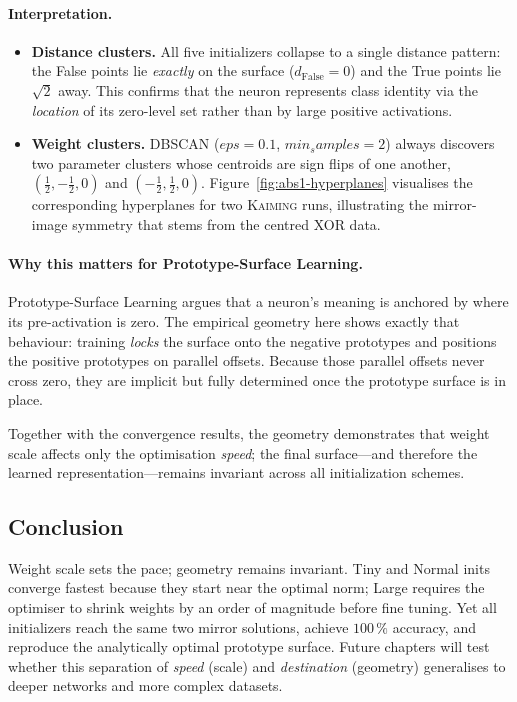 \paragraph{Interpretation.}
\begin{itemize}
  \item \textbf{Distance clusters.}  
        All five initializers collapse to a single distance pattern:
        the False points lie \emph{exactly} on the surface
        ($d_{\text{False}}=0$) and the True points lie \(\sqrt2\) away.
        This confirms that the neuron represents class identity via the
        \emph{location} of its zero-level set rather than by large positive
        activations.
  \item \textbf{Weight clusters.}  
        DBSCAN ($eps = 0.1$, $min_samples = 2$) always discovers two parameter clusters whose centroids are
        sign flips of one another,
        \((\frac12,-\frac12,0)\) and \((-\frac12,\frac12,0)\).
        Figure~\ref{fig:abs1-hyperplanes} visualises the corresponding
        hyperplanes for two \textsc{Kaiming} runs, illustrating the
        mirror-image symmetry that stems from the centred XOR data.
\end{itemize}

\paragraph{Why this matters for Prototype-Surface Learning.}
Prototype-Surface Learning argues that a neuron’s meaning is anchored by
where its pre-activation is zero.  The empirical geometry here shows exactly
that behaviour: training \emph{locks} the surface onto the negative prototypes
and positions the positive prototypes on parallel offsets.  Because those
parallel offsets never cross zero, they are implicit but fully determined once
the prototype surface is in place.

Together with the convergence results, the geometry demonstrates that weight
scale affects only the optimisation \emph{speed}; the final surface—and
therefore the learned representation—remains invariant across all
initialization schemes.

\subsection*{Conclusion}

Weight scale sets the pace; geometry remains invariant.  Tiny and Normal
inits converge fastest because they start near the optimal norm; Large
requires the optimiser to shrink weights by an order of magnitude before fine
tuning.  Yet all initializers reach the same two mirror solutions, achieve
$100\,\%$ accuracy, and reproduce the analytically optimal prototype surface.
Future chapters will test whether this separation of \emph{speed} (scale) and
\emph{destination} (geometry) generalises to deeper networks and more complex
datasets.


